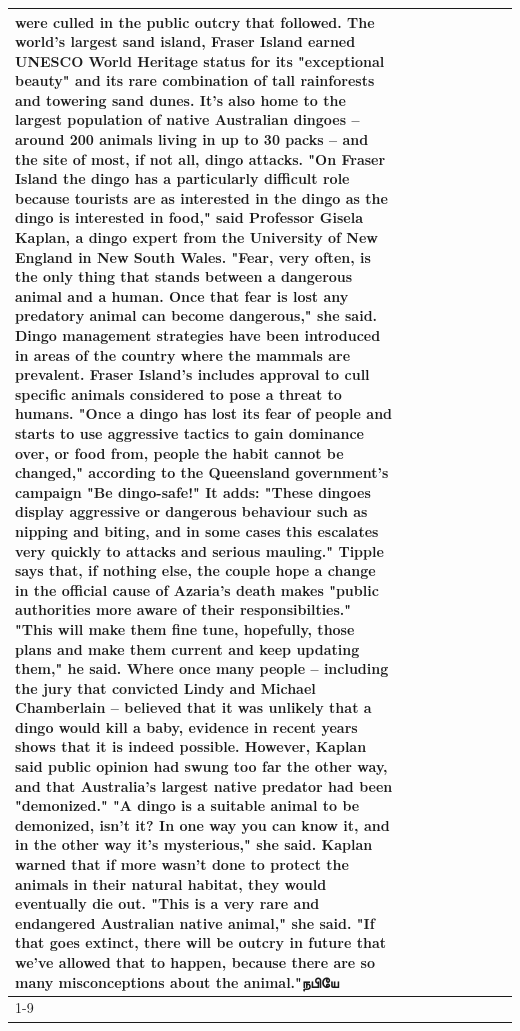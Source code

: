 \begin{table}[H]
\begin{tabular}{lllrlllll}
were culled in the public outcry that followed. The world's largest sand island, Fraser Island earned UNESCO World Heritage status for its "exceptional beauty" and its rare combination of tall rainforests and towering sand dunes. It's also home to the largest population of native Australian dingoes -- around 200 animals living in up to 30 packs -- and the site of most, if not all, dingo attacks. "On Fraser Island the dingo has a particularly difficult role because tourists are as interested in the dingo as the dingo is interested in food," said Professor Gisela Kaplan, a dingo expert from the University of New England in New South Wales. "Fear, very often, is the only thing that stands between a dangerous animal and a human. Once that fear is lost any predatory animal can become dangerous," she said. Dingo management strategies have been introduced in areas of the country where the mammals are prevalent. Fraser Island's includes approval to cull specific animals considered to pose a threat to humans. "Once a dingo has lost its fear of people and starts to use aggressive tactics to gain dominance over, or food from, people the habit cannot be changed," according to the Queensland government's campaign "Be dingo-safe!" It adds: "These dingoes display aggressive or dangerous behaviour such as nipping and biting, and in some cases this escalates very quickly to attacks and serious mauling." Tipple says that, if nothing else, the couple hope a change in the official cause of Azaria's death makes "public authorities more aware of their responsibilties." "This will make them fine tune, hopefully, those plans and make them current and keep updating them," he said. Where once many people -- including the jury that convicted Lindy and Michael Chamberlain -- believed that it was unlikely that a dingo would kill a baby, evidence in recent years shows that it is indeed possible. However, Kaplan said public opinion had swung too far the other way, and that Australia's largest native predator had been "demonized." "A dingo is a suitable animal to be demonized, isn't it? In one way you can know it, and in the other way it's mysterious," she said. Kaplan warned that if more wasn't done to protect the animals in their natural habitat, they would eventually die out. "This is a very rare and endangered Australian native animal," she said. "If that goes extinct, there will be outcry in future that we've allowed that to happen, because there are so many misconceptions about the animal."நபியே \\
\cline{1-9}

\end{tabular}
\end{table}
